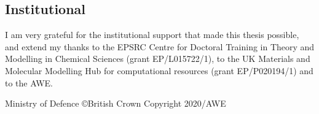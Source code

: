 

\subsection*{Institutional}

I am very grateful for the institutional support that made this thesis possible, and extend my thanks to the EPSRC Centre for Doctoral Training in Theory and Modelling in Chemical Sciences (grant EP/L015722/1), to the UK Materials and Molecular Modelling Hub for computational resources (grant EP/P020194/1) and to the AWE.

\vspace{\baselineskip}

\noindent Ministry of Defence \copyright British Crown Copyright 2020/AWE
